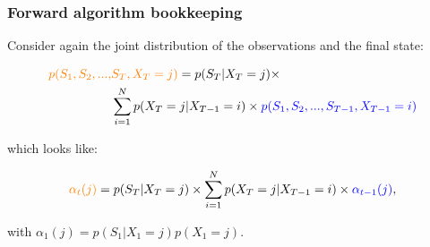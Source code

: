 \documentclass{beamer}
\begin{document}
\begin{frame}
\frametitle{Forward algorithm bookkeeping}

Consider again the joint distribution of the observations and the final state:

\begin{equation}
    \begin{aligned}
    \textcolor{orange}{p(S_1, S_2, ..., }&\textcolor{orange}{S_T, X_T=j)} = p(S_T | X_T = j) \times\\ &\sum_{i=1}^N p(X_T=j | X_{T-1}=i) \times \textcolor{blue}{p(S_1, S_2, ..., S_{T-1}, X_{T-1}=i)}
    \end{aligned}
\end{equation}

which looks like:

\begin{equation}
    \begin{aligned}
    \textcolor{orange}{\alpha_t(j)} = p(S_T | X_T = j) \times\sum_{i=1}^N p(X_T=j | X_{T-1}=i) \times \textcolor{blue}{\alpha_{t-1}(j)},
    \end{aligned}
\end{equation}

with $\alpha_1(j)=p(S_1 | X_1 = j)p(X_1=j)$.
    
\end{frame}
\end{document}
